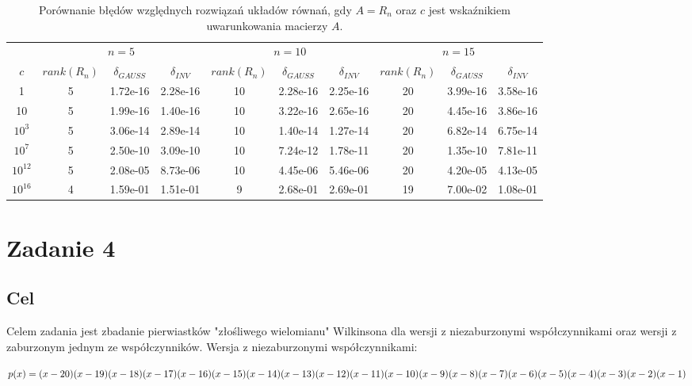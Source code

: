 \documentclass{article}
\begin{document}
\begin{table}[h!]
    \centering
    \begin{tabular}{ |c|c|c|c|c|c|c|c|c|c| } 
        \hline
         & \multicolumn{3}{|c|}{$n = 5$} & \multicolumn{3}{|c|}{$n = 10$} & \multicolumn{3}{|c|}{$n = 15$} \\
        \cline{2-10}
        $c$ & $rank(R_n)$ & $\delta_{GAUSS}$ & $\delta_{INV}$ & $rank(R_n)$ & $\delta_{GAUSS}$ & $\delta_{INV}$ & $rank(R_n)$ & $\delta_{GAUSS}$ & $\delta_{INV}$ \\
        \hline
        1 & 5 & 1.72e-16 & 2.28e-16 & 10 & 2.28e-16 & 2.25e-16 & 20 & 3.99e-16 & 3.58e-16 \\ 
        \hline
        10 & 5 & 1.99e-16 & 1.40e-16 & 10 & 3.22e-16 & 2.65e-16 & 20 & 4.45e-16 & 3.86e-16 \\ 
        \hline
        $10^3$ & 5 & 3.06e-14 & 2.89e-14 & 10 & 1.40e-14 & 1.27e-14 & 20 & 6.82e-14 & 6.75e-14 \\ 
        \hline
        $10^7$ & 5 & 2.50e-10 & 3.09e-10 & 10 & 7.24e-12 & 1.78e-11 & 20 & 1.35e-10 & 7.81e-11 \\ 
        \hline
        $10^{12}$ & 5 & 2.08e-05 & 8.73e-06 & 10 & 4.45e-06 & 5.46e-06 & 20 & 4.20e-05 & 4.13e-05 \\ 
        \hline
        $10^{16}$ & 4 & 1.59e-01 & 1.51e-01 & 9 & 2.68e-01 & 2.69e-01 & 19 & 7.00e-02 & 1.08e-01 \\ 
        \hline
    \end{tabular}
    \caption{Porównanie błędów względnych rozwiązań układów równań, gdy $A = R_n$ oraz $c$ jest wskaźnikiem uwarunkowania macierzy $A$.}
\end{table}

\newpage

\section{Zadanie 4}
\subsection{Cel}
Celem zadania jest zbadanie pierwiastków "złośliwego wielomianu" Wilkinsona dla wersji z niezaburzonymi współczynnikami oraz wersji z zaburzonym jednym ze współczynników. Wersja z niezaburzonymi współczynnikami:
\begin{center}
    $p(x) = (x-20)(x-19)(x-18)(x-17)(x-16)(x-15)(x-14)(x-13)(x-12)(x-11)(x-10)\newline(x-9)(x-8)(x-7)(x-6)(x-5)(x-4)(x-3)(x-2)(x-1)$
\end{center}
\end{document}
